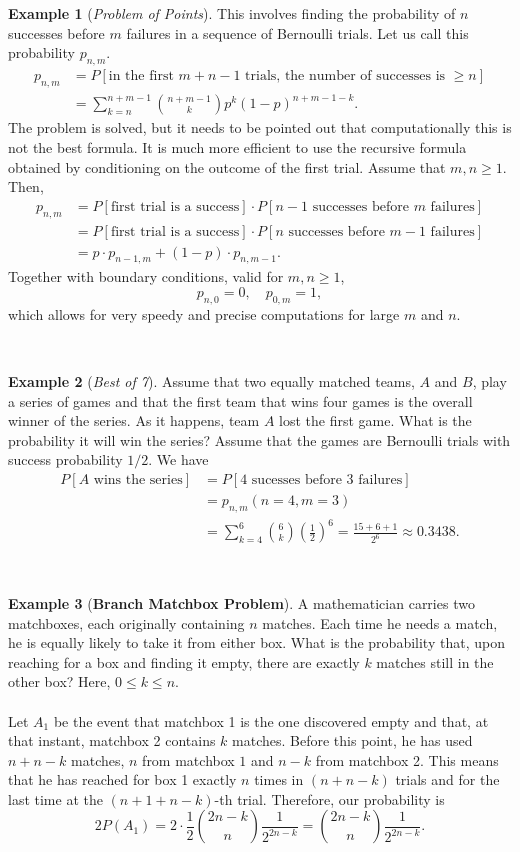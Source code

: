 \documentclass[12pt,a4paper]{article}
\theoremstyle{definition}
\newtheorem{example}{Example}[section]
\theoremstyle{definition}
\theoremstyle{definition}
\theoremstyle{definition}
\theoremstyle{remark}
\theoremstyle{definition}
\begin{document}
\begin{example}[\it Problem of Points]
	This involves finding the probability of $n$ successes before $m$ failures in a sequence of Bernoulli trials. Let us call this probability $p_{n,m}$.\begin{align*}
	p_{n,m}&=P[\text{in the first $m+n-1$ trials, the number of successes is $\geq n$}]\\
	&=\sum_{k=n}^{n+m-1}\binom{n+m-1}{k}p^k(1-p)^{n+m-1-k}.
	\end{align*} The problem is solved, but it needs to be pointed out that computationally this is not the best formula. It is much more efficient to use the recursive formula obtained by conditioning on the outcome of the first trial. Assume that $m,n\geq 1$. Then, \begin{align*}
	p_{n,m}&=P[\text{first trial is a success}]\cdot P[\text{$n-1$ successes before $m$ failures}]\\
	&=P[\text{first trial is a success}]\cdot P[\text{$n$ successes before $m-1$ failures}]\\
	&=p\cdot p_{n-1,m}+(1-p)\cdot p_{n,m-1}.
	\end{align*} Together with boundary conditions, valid for $m,n\geq 1$, \[
	p_{n,0}=0,\quad p_{0,m}=1,
	\] which allows for very speedy and precise computations for large $m$ and $n$.
\end{example}
\
\begin{example}[\it Best of 7]
	Assume that two equally matched teams, $A$ and $B$, play a series of games and that the first team that wins four games is the overall winner of the series. As it happens, team $A$ lost the first game. What is the probability it will win the series? Assume that the games are Bernoulli trials with success probability $1/2$. We have \begin{align*}
	P[\text{$A$ wins the series}]&=P[\text{4 sucesses before 3 failures}]\\
	&=p_{n,m}(n=4, m=3)\\
	&=\sum_{k=4}^{6}\binom{6}{k}\left(\frac{1}{2}\right)^6=\frac{15+6+1}{2^6}\approx0.3438.
	\end{align*}
\end{example}
\
\begin{example}[\bf Branch Matchbox Problem]
	A mathematician carries two matchboxes, each originally containing $n$ matches. Each time he needs a match, he is equally likely to take it from either box. What is the probability that, upon reaching for a box and finding it empty, there are exactly $k$ matches still in the other box? Here, $0\leq k\leq n$.\\
	\\
	Let $A_1$ be the event that matchbox 1 is the one discovered empty and that, at that instant, matchbox 2 contains $k$ matches. Before this point, he has used $n+n-k$ matches, $n$ from matchbox $1$ and $n-k$ from matchbox 2. This means that he has reached for box 1 exactly $n$ times in $(n+n-k)$ trials and for the last time at the $(n+1+n-k)$-th trial. Therefore, our probability is \[
	2P(A_1)=2\cdot\frac{1}{2}\binom{2n-k}{n}\frac{1}{2^{2n-k}}=\binom{2n-k}{n}\frac{1}{2^{2n-k}}.
	\]
\end{example}
\end{document}
